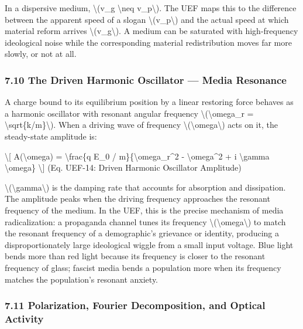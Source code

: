 {In a dispersive medium, \textbackslash(v_g \textbackslash neq v_p\textbackslash). The UEF maps this to the difference between the apparent speed of a slogan \textbackslash(v_p\textbackslash) and the actual speed at which material reform arrives \textbackslash(v_g\textbackslash). A medium can be saturated with high-frequency ideological noise while the corresponding material redistribution moves far more slowly, or not at all.

\protect{}
\subsubsection{7.10 The Driven Harmonic Oscillator --- Media Resonance}\label{the-driven-harmonic-oscillator-media-resonance}

A charge bound to its equilibrium position by a linear restoring force behaves as a harmonic oscillator with resonant angular frequency \textbackslash(\textbackslash omega_r = \textbackslash sqrt\{k/m\}\textbackslash). When a driving wave of frequency \textbackslash(\textbackslash omega\textbackslash) acts on it, the steady-state amplitude is:

\textbackslash{[}
A(\textbackslash omega) = \textbackslash frac\{q E_0 / m\}\{\textbackslash omega_r^2 - \textbackslash omega^2 + i \textbackslash gamma \textbackslash omega\}
\label{eq:uef-14}
\textbackslash{]} {(Eq. UEF-14: Driven Harmonic Oscillator Amplitude)}

\textbackslash(\textbackslash gamma\textbackslash) is the damping rate that accounts for absorption and dissipation. The amplitude peaks when the driving frequency approaches the resonant frequency of the medium. In the UEF, this is the precise mechanism of media radicalization: a propaganda channel tunes its frequency \textbackslash(\textbackslash omega\textbackslash) to match the resonant frequency of a demographic's grievance or identity, producing a disproportionately large ideological wiggle from a small input voltage. Blue light bends more than red light because its frequency is closer to the resonant frequency of glass; fascist media bends a population more when its frequency matches the population's resonant anxiety.

\protect{}
\subsubsection{7.11 Polarization, Fourier Decomposition, and Optical Activity}\label{polarization-fourier-decomposition-and-optical-activity}

}
